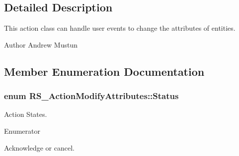 \subsection{Detailed Description}
This action class can handle user events to change the attributes of entities.

\begin{DoxyAuthor}{Author}
Andrew Mustun 
\end{DoxyAuthor}


\subsection{Member Enumeration Documentation}
\hypertarget{classRS__ActionModifyAttributes_a43906273bc466b948a3026a84bcddce6}{
\subsubsection[{Status}]{\setlength{\rightskip}{0pt plus 5cm}enum {\bf R\-S\-\_\-\-Action\-Modify\-Attributes\-::\-Status}}}\label{classRS__ActionModifyAttributes_a43906273bc466b948a3026a84bcddce6}
Action States. \begin{Desc}
\item[Enumerator]\par
\begin{description}
\item[{\em 
\hypertarget{classRS__ActionModifyAttributes_a43906273bc466b948a3026a84bcddce6a143d441c8e4570733842593b0fe8d0b8}{Acknowledge}\label{classRS__ActionModifyAttributes_a43906273bc466b948a3026a84bcddce6a143d441c8e4570733842593b0fe8d0b8}
}]Acknowledge or cancel. \end{description}
\end{Desc}


